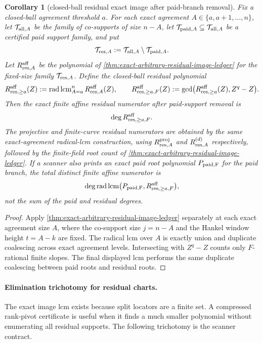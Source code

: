 \documentclass[11pt]{article}
\newtheorem{corollary}[corollary]{Corollary}
\theoremstyle{definition}
\theoremstyle{remark}
\begin{document}
\begin{corollary}[closed-ball residual exact image after paid-branch removal]
\label{cor:residual-exact-image-after-paid-removal}
Fix a closed-ball agreement threshold $a$.  For each exact agreement
$A\in\{a,a+1,\ldots,n\}$, let $\mathcal T_{{\rm all},A}$ be the family of
co-supports of size $n-A$, let $\mathcal T_{{\rm paid},A}\subseteq
\mathcal T_{{\rm all},A}$ be a certified paid support family, and put
\[
        \mathcal T_{{\rm res},A}
        :=\mathcal T_{{\rm all},A}\setminus\mathcal T_{{\rm paid},A}.
\]
Let $R_{{\rm res},A}^{\rm aff}$ be the polynomial of
\cref{thm:exact-arbitrary-residual-image-ledger} for the fixed-size family
$\mathcal T_{{\rm res},A}$.  Define the closed-ball residual polynomial
\[
        R_{{\rm res},\ge a}^{\rm aff}(Z)
        :=\operatorname{rad}\operatorname{lcm}_{A=a}^{n}
          R_{{\rm res},A}^{\rm aff}(Z),
        \qquad
        R_{{\rm res},\ge a,F}^{\rm aff}(Z)
        :=\gcd\bigl(R_{{\rm res},\ge a}^{\rm aff}(Z),Z^q-Z\bigr).
\]
Then the exact finite affine residual numerator after paid-support removal is
\[
        \deg R_{{\rm res},\ge a,F}^{\rm aff}.
\]
The projective and finite-curve residual numerators are obtained by the same
exact-agreement radical-lcm construction, using
$R_{{\rm res},A}^{\rm proj}$ and $R_{{\rm res},A}^{(d)}$ respectively, followed by
the finite-field root count of \cref{thm:exact-arbitrary-residual-image-ledger}.
If a scanner also prints an exact paid root polynomial $P_{\rm paid,F}$ for the
paid branch, the total distinct finite affine numerator is
\[
        \deg\operatorname{rad}\operatorname{lcm}
        \bigl(P_{\rm paid,F},R_{{\rm res},\ge a,F}^{\rm aff}\bigr),
\]
not the sum of the paid and residual degrees.
\end{corollary}

\begin{proof}
Apply \cref{thm:exact-arbitrary-residual-image-ledger} separately at each exact
agreement size $A$, where the co-support size $j=n-A$ and the Hankel window
height $t=A-k$ are fixed.  The radical lcm over $A$ is exactly union and duplicate
coalescing across exact agreement levels.  Intersecting with $Z^q-Z$ counts only
$F$-rational finite slopes.  The final displayed lcm performs the same duplicate
coalescing between paid roots and residual roots.
\end{proof}

\paragraph{Elimination trichotomy for residual charts.}
The exact image lcm exists because split locators are a finite set.  A compressed
rank-pivot certificate is useful when it finds a much smaller polynomial without
enumerating all residual supports.  The following trichotomy is the scanner
contract.
\end{document}
